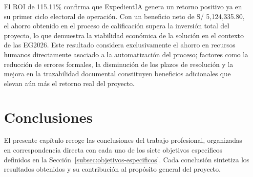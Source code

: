 \documentclass[12pt,a4paper,oneside]{book}
\begin{document}
El ROI de 115.11\% confirma que ExpedientIA genera un retorno positivo ya en su primer ciclo electoral de operación. Con un beneficio neto de S/ 5{,}124{,}335.80, el ahorro obtenido en el proceso de calificación supera la inversión total del proyecto, lo que demuestra la viabilidad económica de la solución en el contexto de las EG2026. Este resultado considera exclusivamente el ahorro en recursos humanos directamente asociado a la automatización del proceso; factores como la reducción de errores formales, la disminución de los plazos de resolución y la mejora en la trazabilidad documental constituyen beneficios adicionales que elevan aún más el retorno real del proyecto.

\chapter{Conclusiones}
\label{cap:conclusiones}

El presente capítulo recoge las conclusiones del trabajo profesional, organizadas en correspondencia directa con cada uno de los siete objetivos específicos definidos en la Sección~\ref{subsec:objetivos-especificos}. Cada conclusión sintetiza los resultados obtenidos y su contribución al propósito general del proyecto.
\end{document}
